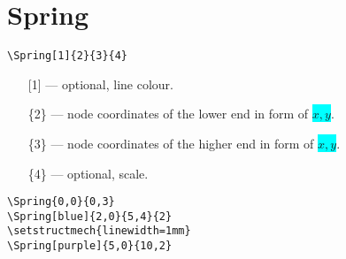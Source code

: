\documentclass[10pt,a4paper]{article}
\newcommand*{\Highlight}[1]{\colorbox{cyan}{\color{red}\texttt{#1}}}
\begin{document}
\section{Spring}
\begin{Verbatim}[frame=single,label=Syntax]
\Spring[1]{2}{3}{4}
\end{Verbatim}
\begin{enumerate}
\item[][1] --- optional, line colour.
\item[]\{2\} --- node coordinates of the lower end in form of \Highlight{$x,y$}.
\item[]\{3\} --- node coordinates of the higher end in form of \Highlight{$x,y$}.
\item[]\{4\} --- optional, scale.
\end{enumerate}
\begin{Verbatim}[frame=single,label=Example]
\Spring{0,0}{0,3}
\Spring[blue]{2,0}{5,4}{2}
\setstructmech{linewidth=1mm}
\Spring[purple]{5,0}{10,2}
\end{Verbatim}
\begin{figure}[H]
\centering
{}
\end{figure}
\end{document}
